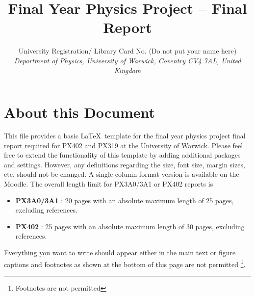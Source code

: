 \documentclass[a4paper,twocolumn,12pt, notitlepage]{article}
\begin{document}
\title{\textbf{\large{Final Year Physics Project – Final Report}}}

\author{\normalsize{University Registration/ Library Card No. (Do not put your name here)} \\
        \small\textit{
        Department of Physics, University of Warwick,
        Coventry CV4 7AL, United Kingdom}}
\date{}


\section{About this Document}
This file provides a basic \LaTeX\ template for the final year physics project final report required for PX402 and PX319 at the University of Warwick. Please feel free to extend the functionality of this template by adding additional packages and settings. However, any definitions regarding the size, font size, margin sizes, etc. should not be changed. A single column format version is available on the Moodle.
The overall length limit for PX3A0/3A1 or PX402 reports
is
\begin{itemize}
\item{{\bf PX3A0/3A1 } : } 20 pages with an absolute maximum length of 25 pages, excluding references.
\item{{\bf PX402 } : } 25 pages with an absolute maximum length of 30 pages, excluding references.
\end{itemize}
Everything you want to write should appear either in the main text or figure captions and footnotes as shown at the bottom of this page are not permitted \footnote{Footnotes are not permitted}.
\end{document}
